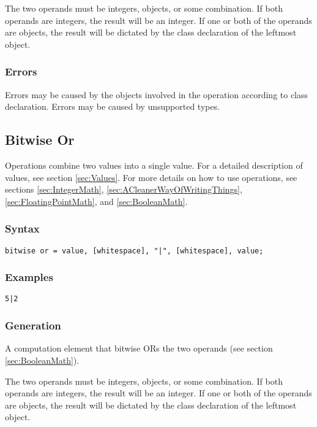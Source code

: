 \documentclass[10pt,a4paper]{article}
\begin{document}
The two operands must be integers, objects, or some combination. If both operands are integers, the result will be an integer. If one or both of the operands are objects, the result will be dictated by the class declaration of the leftmost object.

\subsubsection{Errors}
Errors may be caused by the objects involved in the operation according to class declaration. Errors may be caused by unsupported types.

\newpage




\subsection{Bitwise Or}
Operations combine two values into a single value. For a detailed description of values, see section \ref{sec:Values}. For more details on how to use operations, see sections \ref{sec:IntegerMath}, \ref{sec:ACleanerWayOfWritingThings}, \ref{sec:FloatingPointMath}, and \ref{sec:BooleanMath}.

\subsubsection{Syntax}
\begin{verbatim}
bitwise or = value, [whitespace], "|", [whitespace], value;
\end{verbatim}

\subsubsection{Examples}
\begin{verbatim}
5|2
\end{verbatim}

\subsubsection{Generation}
A computation element that bitwise ORs the two operands (see section \ref{sec:BooleanMath}).

The two operands must be integers, objects, or some combination. If both operands are integers, the result will be an integer. If one or both of the operands are objects, the result will be dictated by the class declaration of the leftmost object.
\end{document}
